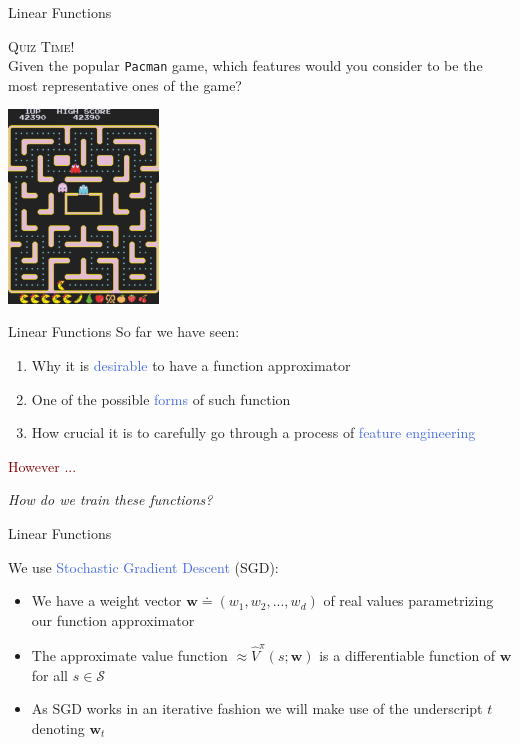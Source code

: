 \documentclass{beamer}
\newenvironment{takeaway}[1]{%
	\definecolor{shadecolor}{gray}{0.9}%
		\begin{shaded}{\color{skymagenta}\noindent\textsc{#1}}\\%
		}{%
		\end{shaded}%
}
\begin{document}
\begin{frame}{Linear Functions}
	\begin{takeaway}{Quiz Time!}
		Given the popular \texttt{Pacman} game, which features would you consider to be the most representative ones of the game?
	
	\end{takeaway}
	\begin{center}
		\includegraphics[width=4cm]{./Images/p}
	\end{center}

\end{frame}

\begin{frame}{Linear Functions}
	So far we have seen:
	\begin{enumerate}
		\item Why it is \textcolor{RoyalBlue}{desirable} to have a function approximator
		\item One of the possible \textcolor{RoyalBlue}{forms} of such function 
		\item How crucial it is to carefully go through a process of \textcolor{RoyalBlue}{feature engineering} 
	\end{enumerate}
	\bigskip

	\centering

	\textcolor{Maroon}{However ...}

	\bigskip
	\textit{How do we train these functions?}

\end{frame}

\begin{frame}{Linear Functions}
	\begin{center}
		We use \textcolor{RoyalBlue}{Stochastic Gradient Descent} (SGD):
	\end{center}
	
	\bigskip

	\begin{itemize}
		\item We have a weight vector $\mathbf{w}\doteq(w_1, w_2, ..., w_d)$ of real values parametrizing our function approximator
		\item The approximate value function $\approx \hat{V}^{\pi}(s;\mathbf{w})$ is a differentiable function of $\mathbf{w}$ for all $s\in\mathcal{S}$
		\item As SGD works in an iterative fashion we will make use of the underscript $t$ denoting $\mathbf{w}_t$
	\end{itemize}
\end{frame}
\end{document}
